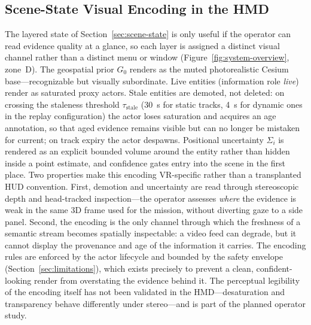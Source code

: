 \documentclass[fleqn]{VRIH2025}
\begin{document}
\subsection{Scene-State Visual Encoding in the HMD}
\label{sec:visual-encoding}
The layered state of Section~\ref{sec:scene-state} is only useful if the operator can read evidence quality at a glance, so each layer is assigned a distinct visual channel rather than a distinct menu or window (Figure~\ref{fig:system-overview}, zone~D). The geospatial prior \(G_0\) renders as the muted photorealistic Cesium base---recognizable but visually subordinate. Live entities (information role \textit{live}) render as saturated proxy actors. Stale entities are demoted, not deleted: on crossing the staleness threshold \(\tau_{\mathrm{stale}}\) (30~s for static tracks, 4~s for dynamic ones in the replay configuration) the actor loses saturation and acquires an age annotation, so that aged evidence remains visible but can no longer be mistaken for current; on track expiry the actor despawns. Positional uncertainty \(\Sigma_i\) is rendered as an explicit bounded volume around the entity rather than hidden inside a point estimate, and confidence gates entry into the scene in the first place. Two properties make this encoding VR-specific rather than a transplanted HUD convention. First, demotion and uncertainty are read through stereoscopic depth and head-tracked inspection---the operator assesses \emph{where} the evidence is weak in the same 3D frame used for the mission, without diverting gaze to a side panel. Second, the encoding is the only channel through which the freshness of a semantic stream becomes spatially inspectable: a video feed can degrade, but it cannot display the provenance and age of the information it carries. The encoding rules are enforced by the actor lifecycle and bounded by the safety envelope (Section~\ref{sec:limitations}), which exists precisely to prevent a clean, confident-looking render from overstating the evidence behind it. The perceptual legibility of the encoding itself has not been validated in the HMD---desaturation and transparency behave differently under stereo---and is part of the planned operator study.
\end{document}
